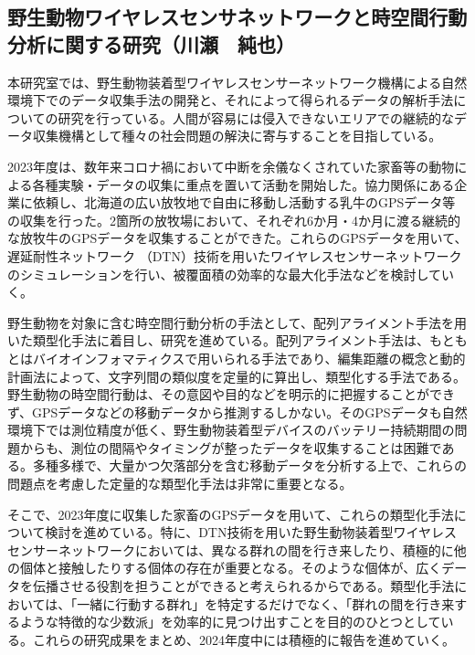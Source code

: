 \subsection{野生動物ワイヤレスセンサネットワークと時空間行動分析に関する研究（川瀬　純也）}
本研究室では、野生動物装着型ワイヤレスセンサーネットワーク機構による自然環境下でのデータ収集手法の開発と、それによって得られるデータの解析手法についての研究を行っている。人間が容易には侵入できないエリアでの継続的なデータ収集機構として種々の社会問題の解決に寄与することを目指している。

2023年度は、数年来コロナ禍において中断を余儀なくされていた家畜等の動物による各種実験・データの収集に重点を置いて活動を開始した。協力関係にある企業に依頼し、北海道の広い放牧地で自由に移動し活動する乳牛のGPSデータ等の収集を行った。2箇所の放牧場において、それぞれ6か月・4か月に渡る継続的な放牧牛のGPSデータを収集することができた。これらのGPSデータを用いて、遅延耐性ネットワーク （DTN）技術を用いたワイヤレスセンサーネットワークのシミュレーションを行い、被覆面積の効率的な最大化手法などを検討していく。
 
野生動物を対象に含む時空間行動分析の手法として、配列アライメント手法を用いた類型化手法に着目し、研究を進めている。配列アライメント手法は、もともとはバイオインフォマティクスで用いられる手法であり、編集距離の概念と動的計画法によって、文字列間の類似度を定量的に算出し、類型化する手法である。野生動物の時空間行動は、その意図や目的などを明示的に把握することができず、GPSデータなどの移動データから推測するしかない。そのGPSデータも自然環境下では測位精度が低く、野生動物装着型デバイスのバッテリー持続期間の問題からも、測位の間隔やタイミングが整ったデータを収集することは困難である。多種多様で、大量かつ欠落部分を含む移動データを分析する上で、これらの問題点を考慮した定量的な類型化手法は非常に重要となる。
 
そこで、2023年度に収集した家畜のGPSデータを用いて、これらの類型化手法について検討を進めている。特に、DTN技術を用いた野生動物装着型ワイヤレスセンサーネットワークにおいては、異なる群れの間を行き来したり、積極的に他の個体と接触したりする個体の存在が重要となる。そのような個体が、広くデータを伝播させる役割を担うことができると考えられるからである。類型化手法においては、「一緒に行動する群れ」を特定するだけでなく、「群れの間を行き来するような特徴的な少数派」を効率的に見つけ出すことを目的のひとつとしている。これらの研究成果をまとめ、2024年度中には積極的に報告を進めていく。

